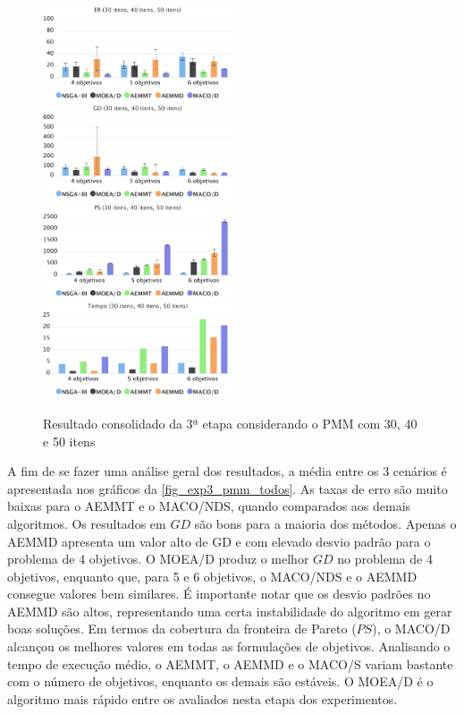 \begin{figure}[!htbp]
	\includegraphics[width=0.5\textwidth]{cap_experimentos/figs/etapa3/er-mkp-todos}
	\includegraphics[width=0.5\textwidth]{cap_experimentos/figs/etapa3/gd-mkp-todos}
	\includegraphics[width=0.5\textwidth]{cap_experimentos/figs/etapa3/ps-mkp-todos}
	\includegraphics[width=0.5\textwidth]{cap_experimentos/figs/etapa3/time-mkp-todos}
	\caption{\label{fig_exp3_pmm_todos}Resultado consolidado da 3ª etapa considerando o PMM com 30, 40 e 50 itens}
\end{figure}

A fim de se fazer uma análise geral dos resultados, a média entre os 3 cenários é apresentada nos gráficos da \autoref{fig_exp3_pmm_todos}. As taxas de erro são muito baixas para o AEMMT e o MACO/NDS, quando comparados aos demais algoritmos. Os resultados em $GD$ são bons para a maioria dos métodos. Apenas o AEMMD apresenta um valor alto de GD e com elevado desvio padrão para o problema de 4 objetivos. O MOEA/D produz o melhor $GD$ no problema de 4 objetivos, enquanto que, para 5 e 6 objetivos, o MACO/NDS e o AEMMD consegue valores bem similares. É importante notar que os desvio padrões no AEMMD são altos, representando uma certa instabilidade do algoritmo em gerar boas soluções. Em termos da cobertura da fronteira de Pareto ($PS$), o MACO/D alcançou os melhores valores em todas as formulações de objetivos. Analisando o tempo de execução médio, o AEMMT, o AEMMD e o MACO/S variam bastante com o número de objetivos, enquanto os demais são estáveis. O MOEA/D é o algoritmo mais rápido entre os avaliados nesta etapa dos experimentos.

